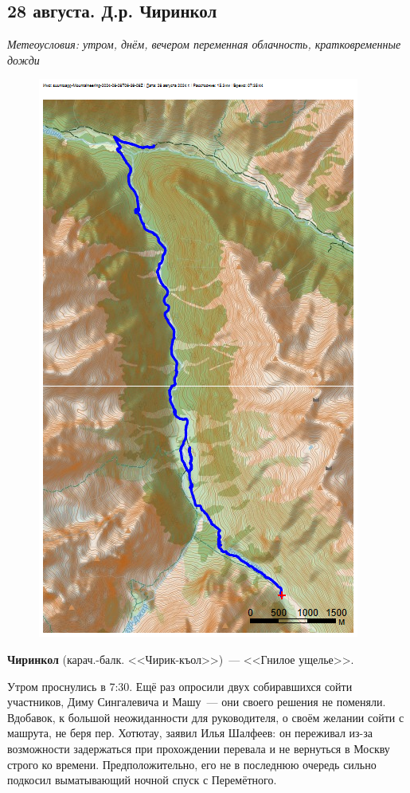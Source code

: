 \subsection{28 августа. Д.р. Чиринкол}

\textit{Метеоусловия: утром, днём, вечером переменная облачность, кратковременные дожди}

\begin{figure}[h!]
	\centering
	\includegraphics[angle=0, width=0.7\linewidth]{../pics/mini_maps/28}
	\label{fig:mini_28}
\end{figure}

\textbf{Чиринкол} (карач.-балк. <<Чирик-къол>>)~--- <<Гнилое ущелье>>.

Утром проснулись в 7:30. Ещё раз опросили двух собиравшихся сойти участников, Диму Сингалевича и Машу~--- они своего решения не поменяли. Вдобавок, к большой неожиданности для руководителя, о своём желании сойти с машрута, не беря пер. Хотютау, заявил Илья Шалфеев: он переживал из-за возможности задержаться при прохождении перевала и не вернуться в Москву строго ко времени. Предположительно, его не в последнюю очередь сильно подкосил выматывающий ночной спуск с Перемётного.

